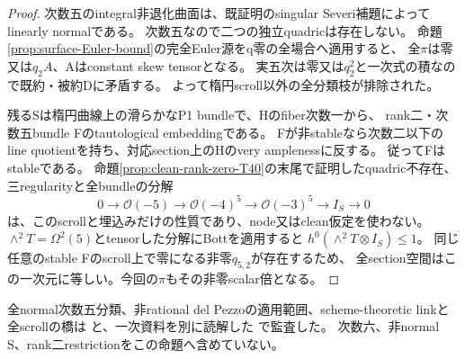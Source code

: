 \documentclass[a4paper,11pt]{ltjsarticle}
\theoremstyle{definition}
\begin{document}
\begin{proof}
次数五のintegral非退化曲面は、既証明のsingular Severi補題によってlinearly normalである。
次数五なので二つの独立quadricは存在しない。
命題\ref{prop:surface-Euler-bound}の完全Euler源をq零の全場合へ適用すると、
全$\pi$は零又は$q_2A$、Aはconstant skew tensorとなる。
実五次は零又は$q_2^2$と一次式の積なので既約・被約Dに矛盾する。
よって楕円scroll以外の全分類枝が排除された。

残るSは楕円曲線上の滑らかなP1 bundleで、Hのfiber次数一から、
rank二・次数五bundle Fのtautological embeddingである。
Fが非stableなら次数二以下のline quotientを持ち、対応section上のHのvery amplenessに反する。
従ってFはstableである。
命題\ref{prop:clean-rank-zero-T40}の末尾で証明したquadric不存在、三regularityと全bundleの分解
\[
 0\to\mathcal O(-5)\to\mathcal O(-4)^5\to\mathcal O(-3)^5\to I_S\to0
\]
は、このscrollと埋込みだけの性質であり、node又はclean仮定を使わない。
$\wedge^2T=\Omega^2(5)$とtensorした分解にBottを適用すると
$h^0(\wedge^2T\otimes I_S)\le1$。
同じ任意のstable Fのscroll上で零になる非零$q_{5,2}$\cite[\S3.2]{mpq52}が存在するため、
全section空間はこの一次元に等しい。今回の$\pi$もその非零scalar倍となる。
\end{proof}
全normal次数五分類、非rational del Pezzoの適用範囲、scheme-theoretic linkと全scrollの橋は
と、一次資料を別に読解した
で監査した。
次数六、非normal S、rank二restrictionをこの命題へ含めていない。
\end{document}
